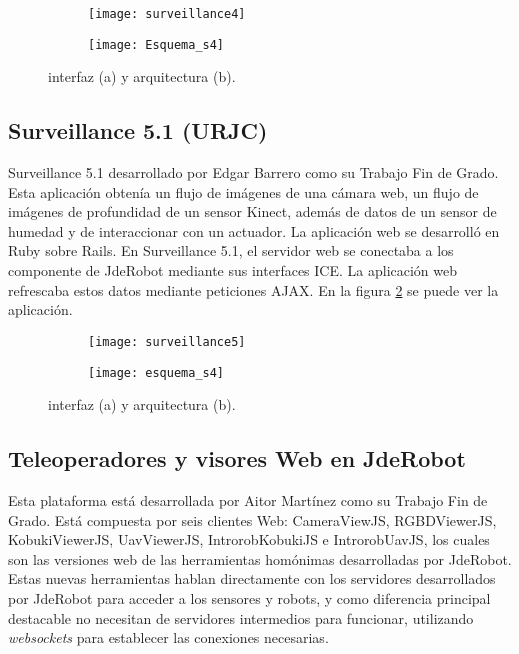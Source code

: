\begin{figure}[h]
\centering
  \begin{subfigure}[]{110mm}
    \texttt{[image: surveillance4]}
  \end{subfigure}
  \hspace{5pt}
  \begin{subfigure}[]{110mm}
    \texttt{[image: Esquema\_s4]}
  \end{subfigure}
  \caption{interfaz (a) y arquitectura (b).}\label{fig:surveillance4}
\end{figure}



\subsection{Surveillance 5.1 (URJC)}

Surveillance 5.1 desarrollado por Edgar Barrero como su Trabajo Fin de Grado. Esta aplicación obtenía un flujo de imágenes de una cámara web, un flujo de imágenes de profundidad de un sensor Kinect, además de datos de un sensor de humedad y de interaccionar con un actuador. La aplicación web se desarrolló en Ruby sobre Rails. En Surveillance 5.1, el servidor web se conectaba a los componente de JdeRobot mediante sus interfaces ICE. La aplicación web refrescaba estos datos mediante peticiones AJAX.  En la figura \ref{fig:surveillance5} se puede ver la aplicación.\\


\begin{figure}[h]
\centering
  \begin{subfigure}[]{110mm}
    \texttt{[image: surveillance5]}
  \end{subfigure}
  \hspace{5pt}
  \begin{subfigure}[]{110mm}
    \texttt{[image: esquema\_s4]}
  \end{subfigure}
  \caption{interfaz (a) y arquitectura (b).}\label{fig:surveillance5}
\end{figure}


\subsection{Teleoperadores y visores Web en JdeRobot}

Esta plataforma está desarrollada por Aitor Martínez como su Trabajo Fin de Grado. Está compuesta por seis clientes Web: CameraViewJS, RGBDViewerJS, KobukiViewerJS, UavViewerJS, IntrorobKobukiJS e IntrorobUavJS, los cuales son las versiones web de las herramientas homónimas desarrolladas por JdeRobot. Estas nuevas herramientas hablan directamente con los servidores desarrollados por JdeRobot para acceder a los sensores y robots, y como diferencia principal destacable no necesitan de servidores intermedios para funcionar, utilizando \emph{websockets} para establecer las conexiones necesarias.\\

